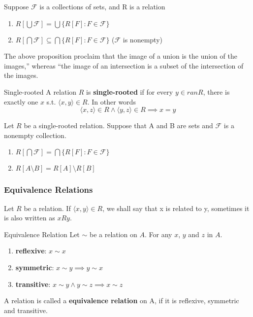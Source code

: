 \begin{proposition}{}{}
    Suppose $\mathcal{F}$ is a collections of sets, and R is a relation
    \begin{enumerate}

        \item $R[\bigcup \mathcal{F}] = \bigcup \{R[F] : F \in \mathcal{F}\}$
        \item $R[\bigcap \mathcal{F}] \subseteq \bigcap \{R[F] : F \in \mathcal{F}\}$ ($\mathcal{F}$ is nonempty)

    \end{enumerate}
\end{proposition}
The above proposition proclaim that the image of a union is the union of the images,” whereas “the image of an intersection is a subset of the intersection of the images.

\begin{definition}{Single-rooted}{}
    A relation $R$ is \textbf{single-rooted} if for every $y \in ran R$, there is exactly one $x$ s.t. $\langle x,y \rangle \in R$. In other words
    \begin{equation*}
        \langle x,z \rangle \in R \land \langle y,z \rangle \in R \implies x = y
    \end{equation*}
\end{definition}

\begin{corollary}{}{}
    Let $R$ be a single-rooted relation. Suppose that A and B are sets and $\mathcal{F}$ is a nonempty collection.
    \begin{enumerate}

        \item $R[\bigcap \mathcal{F}] = \bigcap \{R[F] : F \in \mathcal{F}\}$ 
        \item $R[A \setminus B] = R[A] \setminus R[B]$

    \end{enumerate}
\end{corollary}

\subsubsection{Equivalence Relations}
Let $R$ be a relation. If $\langle x,y \rangle \in R$, we shall say that x is related to y, sometimes it is also written as $xRy$. 

\begin{definition}{Equivalence Relation}{}
    Let $\sim$ be a relation on $A$. For any $x$, $y$ and $z$ in $A$.
    \begin{enumerate}

        \item \textbf{reflexive}: $x \sim x$
        \item \textbf{symmetric}: $x \sim y \implies y \sim x$
        \item \textbf{transitive}: $x \sim y \land y \sim z \implies x \sim z$

    \end{enumerate}
    A relation is called a \textbf{equivalence relation} on A, if it is reflexive, symmetric and transitive.
\end{definition}

